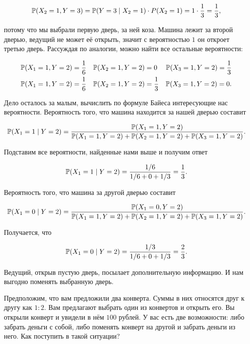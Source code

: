 \[ \mathbb{P}(X_2 = 1, Y = 3) = \mathbb{P}(Y=3 \mid X_2 = 1) \cdot P(X_2 = 1) = 1 \cdot \frac{1}{3} = \frac{1}{3},\]

потому что мы выбрали первую дверь, за ней коза. Машина лежит за второй дверью, ведущий не может её открыть, значит с вероятностью $1$ он откроет третью дверь. Рассуждая по аналогии, можно найти все остальные вероятности:
 
\begin{equation*}
\begin{aligned} 
\mathbb{P}(X_1 = 1, Y = 2) = \frac{1}{6}    &  \quad  \mathbb{P}(X_2 = 1, Y = 2) = 0  &  \mathbb{P}(X_3 = 1, Y = 2) = \frac{1}{3}\\
\mathbb{P}(X_1 = 1, Y = 2) = \frac{1}{6}    &   \quad \mathbb{P}(X_2 = 1,  Y = 2) = \frac{1}{3}  &  \mathbb{P}(X_3 = 1, Y = 2) = 0.
\end{aligned}
\end{equation*}

Дело осталось за малым, вычислить по формуле Байеса интересующие нас вероятности.  Вероятность того, что машина находится за нашей дверью составит

\begin{equation*}
\mathbb{P}(X_1 = 1 \mid Y = 2) = \frac{\mathbb{P}(X_1 = 1, Y = 2)}{\mathbb{P}(X_1 = 1, Y=2) + \mathbb{P}(X_2 = 1, Y = 2) +  \mathbb{P}(X_3 = 1, Y = 2)} .
\end{equation*}

Подставим все вероятности, найденные нами выше и получим ответ 

\begin{equation*}
\mathbb{P}(X_1 = 1 \mid Y = 2) =   \frac{1/6}{1/6 +  0 + 1/3} =  \frac{1}{3}.
\end{equation*}

Вероятность того, что машина за другой дверью составит

\begin{equation*}
 \mathbb{P}(X_1 = 0 \mid Y = 2) = \frac{\mathbb{P}(X_1 = 0, Y = 2)}{\mathbb{P}(X_1 = 1, Y=2) + \mathbb{P}(X_2 = 1, Y = 2) +  \mathbb{P}(X_3 = 1, Y = 2)}.
\end{equation*}

Получается, что 

\begin{equation*}
\mathbb{P}(X_1 = 0 \mid Y = 2) =   \frac{1/3}{1/6 +  0 + 1/3} =  \frac{2}{3}. 
\end{equation*}

Ведущий, открыв пустую дверь, посылает дополнительную информацию. И нам выгодно поменять выбранную дверь. 

\begin{chudo}
Предположим, что вам предложили два конверта. Суммы в них относятся друг к другу как $1:2$. Вам предлагают выбрать один из конвертов и открыть его. Вы открыли конверт и увидели в нём $100$ рублей. У вас есть две возможности: либо забрать деньги с собой, либо поменять конверт на другой и забрать деньги из него. Как поступить в такой ситуации?
\end{chudo}

